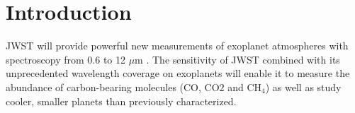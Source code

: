 \documentclass{aastex62}
\begin{document}


\section{Introduction} \label{sec:intro}

JWST will provide powerful new measurements of exoplanet atmospheres with spectroscopy from 0.6 to 12 $\mu$m
\citep{beichman2014pasp,greene2016jwst_trans,howe2017informationJWST,barstow2015jwstSystematics,schlawin2018JWSTforecasts}.
The sensitivity of JWST combined with its unprecedented wavelength coverage on exoplanets will enable it to measure the abundance of carbon-bearing molecules (CO, CO$2$ and CH$_4$) as well as study cooler, smaller planets than previously characterized.
\end{document}
